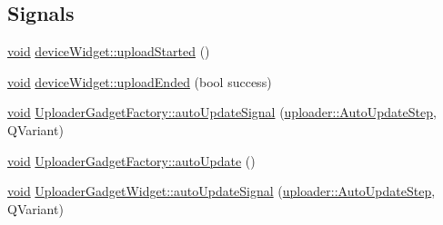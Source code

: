 \subsection*{\-Signals}
\begin{DoxyCompactItemize}
\item 
\hyperlink{group___u_a_v_objects_plugin_ga444cf2ff3f0ecbe028adce838d373f5c}{void} \hyperlink{group___y_modem_uploader_ga237b72fb1450126236fb690941ce7cf0}{device\-Widget\-::upload\-Started} ()
\item 
\hyperlink{group___u_a_v_objects_plugin_ga444cf2ff3f0ecbe028adce838d373f5c}{void} \hyperlink{group___y_modem_uploader_ga80c1daefa8adc8af10178e3ad8c52307}{device\-Widget\-::upload\-Ended} (bool success)
\item 
\hyperlink{group___u_a_v_objects_plugin_ga444cf2ff3f0ecbe028adce838d373f5c}{void} \hyperlink{group___y_modem_uploader_ga1db019129aec5db54cea977a3628092e}{\-Uploader\-Gadget\-Factory\-::auto\-Update\-Signal} (\hyperlink{namespaceuploader_adb90c08cc33a348c2363c1d7a9626422}{uploader\-::\-Auto\-Update\-Step}, \-Q\-Variant)
\item 
\hyperlink{group___u_a_v_objects_plugin_ga444cf2ff3f0ecbe028adce838d373f5c}{void} \hyperlink{group___y_modem_uploader_gaf1635d4877cd9ffd1933c45884278845}{\-Uploader\-Gadget\-Factory\-::auto\-Update} ()
\item 
\hyperlink{group___u_a_v_objects_plugin_ga444cf2ff3f0ecbe028adce838d373f5c}{void} \hyperlink{group___y_modem_uploader_ga87ead7222452d2bbbbde0f0450ed8c11}{\-Uploader\-Gadget\-Widget\-::auto\-Update\-Signal} (\hyperlink{namespaceuploader_adb90c08cc33a348c2363c1d7a9626422}{uploader\-::\-Auto\-Update\-Step}, \-Q\-Variant)
\end{DoxyCompactItemize}
